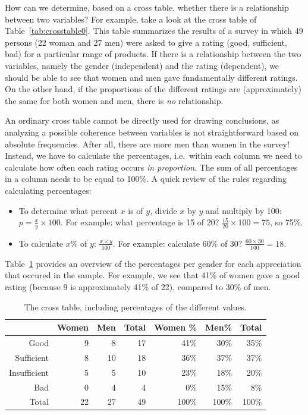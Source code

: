 How can we determine, based on a cross table, whether there is a relationship between two variables? For example, take a look at the cross table of Table~\ref{tab:crosstable0}. This table summarizes the results of a survey in which 49 persons (22 woman and 27 men) were asked to give a rating (good, sufficient, bad) for a particular range of products. If there is a relationship between the two variables, namely the gender (independent) and the rating (dependent), we should be able to see that women and men gave fundamentally different ratings. On the other hand, if the proportions of the different ratings are (approximately) the same for both women and men, there is \emph{no} relationship.

An ordinary cross table cannot be directly used for drawing conclusions, as analyzing a possible coherence between variables is not straightforward based on absolute frequencies. After all, there are more men than women in the survey! Instead, we have to calculate the percentages, i.e.~within each column we need to calculate how often each rating occurs \emph{in proportion}. The sum of all percentages in a column needs to be equal to 100\%. A quick review of the rules regarding calculating percentages:

\begin{itemize}
  \item To determine what percent $x$ is of $y$, divide $x$ by $y$ and multiply by 100: $p = \frac{x}{y} \times 100$. For example: what percentage is 15 of 20? $\frac{15}{20} \times 100 = 75$, so 75\%.
  \item To calculate $x\%$ of $y$: $\frac{x \times y}{100}$. For example: calculate 60\% of 30? $\frac{60 \times 30}{100} = 18$.
\end{itemize}

Table~\ref{tab:crosstable1} provides an overview of the percentages per gender for each appreciation that occured in the sample. For example, we see that 41\% of women gave a good rating (because 9 is approximately 41\% of 22), compared to 30\% of men.

\begin{table} \centering
  \begin{tabular}{@{}rrrrrrr@{}}
  	\toprule
                & Women & Men &  Total & Women \% & Men\% & Total  \\
  	\midrule
  	       Good &     9 &   8 &     17 &     41\% &  30\% &   35\% \\
     Sufficient &     8 &  10 &     18 &     36\% &  37\% &   37\% \\
   Insufficient &     5 &   5 &     10 &     23\% &  18\% &   20\% \\
            Bad &     0 &   4 &      4 &      0\% &  15\% &    8\% \\
  	      Total &    22 &  27 &     49 &    100\% & 100\% &  100\% \\
  	\bottomrule
  \end{tabular}
  \caption{The cross table, including percentages of the different values.}
  \label{tab:crosstable1}
\end{table}

